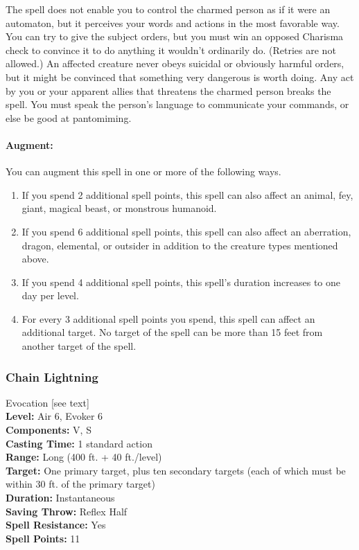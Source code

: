 The spell does not enable you to control the charmed person as if it were an automaton, 
but it perceives your words and actions in the most favorable way. You can try to give the subject orders, 
but you must win an opposed Charisma check to convince it to do anything it wouldn't ordinarily do. 
(Retries are not allowed.) An affected creature never obeys suicidal or obviously harmful orders, 
but it might be convinced that something very dangerous is worth doing. 
Any act by you or your apparent allies that threatens the charmed person breaks the spell. 
You must speak the person's language to communicate your commands, or else be good at pantomiming.

\paragraph{Augment:} You can augment this spell in one or more of the following ways.
\begin{enumerate}
 \item If you spend 2 additional spell points, this spell can also affect an animal, fey, giant, magical beast, or monstrous humanoid.
 \item If you spend 6 additional spell points, this spell can also affect an aberration, dragon, elemental, or outsider in addition to the creature types mentioned above.
 \item If you spend 4 additional spell points, this spell's duration increases to one day per level.
 \item For every 3 additional spell points you spend, this spell can affect an additional target. 
No target of the spell can be more than 15 feet from another target of the spell.
\end{enumerate}

\subsubsection{Chain Lightning}
\label{Spell:ChainLightning}
Evocation [see text]
\\ \textbf{Level:} Air 6, Evoker 6
\\ \textbf{Components:} V, S
\\ \textbf{Casting Time:} 1 standard action
\\ \textbf{Range:} Long (400 ft. + 40 ft./level)
\\ \textbf{Target:} One primary target, plus ten secondary targets (each of which must be within 30 ft. of the primary target)
\\ \textbf{Duration:} Instantaneous
\\ \textbf{Saving Throw:} Reflex Half
\\ \textbf{Spell Resistance:} Yes
\\ \textbf{Spell Points:} 11

